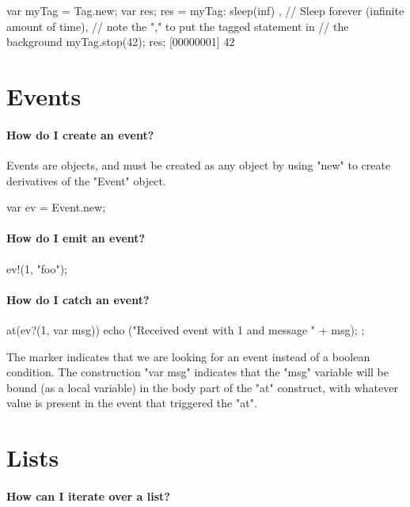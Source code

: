 \begin{urbifixme}
var myTag = Tag.new;
var res;
{ res = { myTag: sleep(inf) } }, // Sleep forever (infinite amount of time),
                                 // note the "," to put the tagged statement in
                                 // the background
myTag.stop(42);
res;
[00000001] 42
\end{urbifixme}

\section{Events}
\paragraph{How do I create an event?}
Events are objects, and must be created as any object by using "new" to create
derivatives of the "Event" object.

\begin{urbifixme}
var ev = Event.new;
\end{urbifixme}

\paragraph{How do I emit an event?}
\begin{urbifixme}
ev!(1, "foo");
\end{urbifixme}

\paragraph{How do I catch an event?}
\begin{urbifixme}
at(ev?(1, var msg)) {
  echo ("Received event with 1 and message " + msg);
};
\end{urbifixme}

The  marker indicates that we are looking for an event instead of a
boolean condition. The construction "var msg" indicates that the "msg"
variable will be bound (as a local variable) in the body part of the "at"
construct, with whatever value is present in the event that triggered the
"at".

\section{Lists}
\paragraph{How can I iterate over a list?}

